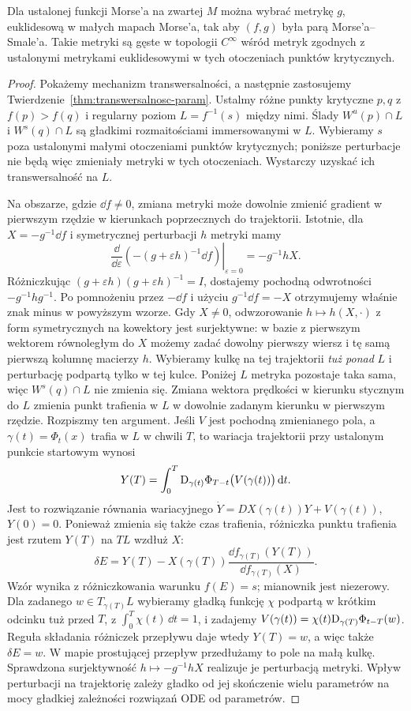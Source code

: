 \begin{twierdzenie}
\label{thm:gen-ms-17}
Dla ustalonej funkcji Morse'a
na zwartej $M$ można wybrać
metrykę $g$, euklidesową w małych
mapach Morse'a, tak aby
$(f,g)$ była parą
Morse'a--Smale'a. Takie metryki
są gęste w topologii $C^\infty$ wśród metryk
zgodnych z ustalonymi metrykami euklidesowymi
w tych otoczeniach punktów krytycznych.
\end{twierdzenie}
\begin{proof}
Pokażemy mechanizm
transwersalności, a następnie
zastosujemy
Twierdzenie~\ref{thm:transwersalnosc-param}.
Ustalmy różne punkty krytyczne
$p,q$ z $f(p)>f(q)$ i regularny
poziom $L=f^{-1}(s)$ między nimi.
Ślady $W^u(p)\cap L$ i $W^s(q)\cap L$
są gładkimi rozmaitościami immersowanymi w $L$.
Wybieramy $s$ poza ustalonymi małymi otoczeniami
punktów krytycznych; poniższe perturbacje
nie będą więc zmieniały metryki w tych otoczeniach.
Wystarczy uzyskać ich
transwersalność na $L$.

Na obszarze, gdzie $\dd f\ne0$,
zmiana metryki może dowolnie
zmienić gradient w pierwszym
rzędzie w kierunkach poprzecznych
do trajektorii. Istotnie, dla
$X=-g^{-1}\dd f$ i symetrycznej
perturbacji $h$ metryki mamy
\[
 \left.\frac{\dd}{\dd\varepsilon}
  (- (g+\varepsilon h)^{-1}\dd f)
 \right|_{\varepsilon=0}
  =-g^{-1}hX.
\]
Różniczkując $(g+\varepsilon h)(g+\varepsilon h)^{-1}=I$,
dostajemy pochodną odwrotności $-g^{-1}hg^{-1}$.
Po pomnożeniu przez $-\dd f$ i użyciu $g^{-1}\dd f=-X$
otrzymujemy właśnie znak minus w powyższym wzorze.
Gdy $X\ne0$, odwzorowanie
$h\mapsto h(X,\cdot)$ z form
symetrycznych na kowektory
jest surjektywne: w bazie
z pierwszym wektorem
równoległym do $X$ możemy
zadać dowolny pierwszy
wiersz i tę samą pierwszą
kolumnę macierzy $h$.
Wybieramy kulkę na tej
trajektorii \emph{tuż ponad} $L$
i perturbację podpartą tylko
w tej kulce. Poniżej $L$
metryka pozostaje taka sama,
więc $W^s(q)\cap L$ nie zmienia
się. Zmiana wektora prędkości
w kierunku stycznym do $L$
zmienia punkt trafienia w $L$
w dowolnie zadanym kierunku w pierwszym rzędzie.
Rozpiszmy ten argument. Jeśli $V$ jest pochodną zmienianego
pola, a $\gamma(t)=\Phi_t(x)$ trafia w $L$ w chwili $T$,
to wariacja trajektorii przy ustalonym punkcie startowym wynosi
\[
 Y(T)=\int_0^T \mathrm D_{\gamma(t)}\Phi_{T-t}
                          \bigl(V(\gamma(t))\bigr)\,\mathrm d t.
\]
Jest to rozwiązanie równania wariacyjnego
$\dot Y=DX(\gamma(t))Y+V(\gamma(t))$, $Y(0)=0$.
Ponieważ zmienia się także czas trafienia, różniczka
punktu trafienia jest rzutem $Y(T)$ na $TL$ wzdłuż $X$:
\[
 \delta E=Y(T)-X(\gamma(T))
       \frac{\dd f_{\gamma(T)}(Y(T))}{\dd f_{\gamma(T)}(X)}.
\]
Wzór wynika z różniczkowania warunku $f(E)=s$;
mianownik jest niezerowy.
Dla zadanego $w\in T_{\gamma(T)}L$ wybieramy
gładką funkcję $\chi$ podpartą w krótkim odcinku tuż
przed $T$, z $\int_0^T\chi(t)\,\dd t=1$, i zadajemy
$V(\gamma(t))=\chi(t)\mathrm D_{\gamma(T)}\Phi_{t-T}(w)$.
Reguła składania różniczek przepływu daje wtedy $Y(T)=w$,
a więc także $\delta E=w$.
W mapie prostującej przepływ przedłużamy to pole
na małą kulkę. Sprawdzona surjektywność $h\mapsto-g^{-1}hX$
realizuje je perturbacją metryki.
Wpływ perturbacji na
trajektorię zależy gładko
od jej skończenie wielu
parametrów na mocy
gładkiej zależności
rozwiązań ODE od parametrów.


\end{proof}
